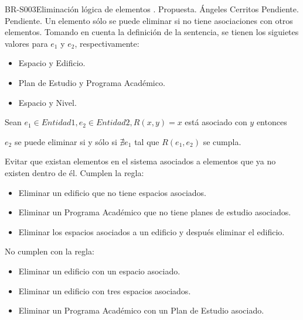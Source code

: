 \begin{BusinessRule}{BR-S003}{Eliminación lógica de elementos}
	{\bcCondition}    %
	{\btEnabler}     %
	{\blControlling}    %
	.
	\BRItem[Estado] Propuesta.
	 Ángeles Cerritos
	 Pendiente.
	 Pendiente.
	\BRItem[Descripción] Un elemento sólo se puede eliminar si no tiene asociaciones con otros elementos. Tomando en cuenta la definición de la sentencia, se tienen los siguietes valores para $e_1$ y $e_2$, respectivamente:
	
	\begin{itemize}
		\item Espacio y Edificio.
		\item Plan de Estudio y Programa Académico.
		\item Espacio y Nivel.
	\end{itemize}
	
	\BRItem[Sentencia] Sean $ e_1 \in Entidad1 , e_2 \in Entidad2, R(x,y) = x $ está asociado con $ y $ entonces
	
	$ e_2 $ se puede eliminar si y sólo si $ \nexists e_1 $ tal que $ R(e_1, e_2) $ se cumpla.
	
	
	\BRItem[Motivación] Evitar que existan elementos en el sistema asociados a elementos que ya no existen dentro de él.
	 Cumplen la regla:
	\begin{itemize}
		\item Eliminar un edificio que no tiene espacios asociados.
		\item Eliminar un Programa Académico que no tiene planes de estudio asociados.
		\item Eliminar los espacios asociados a un edificio y después eliminar el edificio.
	\end{itemize}
	 No cumplen con la regla:
	\begin{itemize}
		\item Eliminar un edificio con un espacio asociado.
		\item Eliminar un edificio con tres espacios asociados.
		\item Eliminar un Programa Académico con un Plan de Estudio asociado.
	\end{itemize}
\end{BusinessRule}

